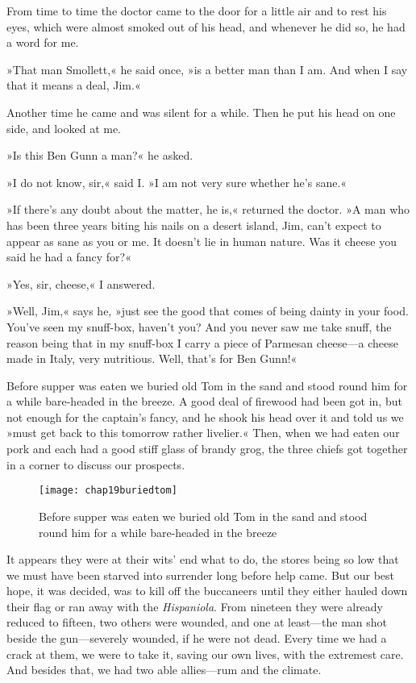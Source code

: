 From time to time the doctor came to the door for a little air and to rest his eyes, which were almost smoked out of his head, and whenever he did so, he had a word for me.

»That man Smollett,« he said once, »is a better man than I am. And when I say that it means a deal, Jim.«

Another time he came and was silent for a while. Then he put his head on one side, and looked at me.

»Is this Ben Gunn a man?« he asked.

»I do not know, sir,« said I. »I am not very sure whether he's sane.«

»If there's any doubt about the matter, he is,« returned the doctor. »A man who has been three years biting his nails on a desert island, Jim, can't expect to appear as sane as you or me. It doesn't lie in human nature. Was it cheese you said he had a fancy for?«

»Yes, sir, cheese,« I answered.

»Well, Jim,« says he, »just see the good that comes of being dainty in your food. You've seen my snuff-box, haven't you? And you never saw me take snuff, the reason being that in my snuff-box I carry a piece of Parmesan cheese—a cheese made in Italy, very nutritious. Well, that's for Ben Gunn!«

Before supper was eaten we buried old Tom in the sand and stood round him for a while bare-headed in the breeze. A good deal of firewood had been got in, but not enough for the captain's fancy, and he shook his head over it and told us we »must get back to this tomorrow rather livelier.« Then, when we had eaten our pork and each had a good stiff glass of brandy grog, the three chiefs got together in a corner to discuss our prospects.

  \begin{figure}[p]
\centering
\texttt{[image: chap19buriedtom]}
\caption[We buried old Tom in the sand]{Before supper was eaten we buried old Tom in the sand and stood round him for a while bare-headed in the breeze}
\end{figure} 

It appears they were at their wits' end what to do, the stores being so low that we must have been starved into surrender long before help came. But our best hope, it was decided, was to kill off the buccaneers until they either hauled down their flag or ran away with the \textit{Hispaniola}. From nineteen they were already reduced to fifteen, two others were wounded, and one at least—the man shot beside the gun—severely wounded, if he were not dead. Every time we had a crack at them, we were to take it, saving our own lives, with the extremest care. And besides that, we had two able allies—rum and the climate.

